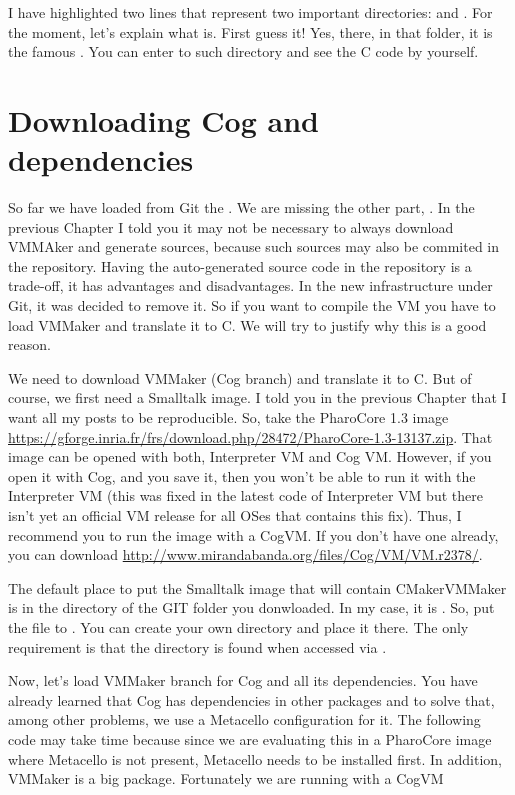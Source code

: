 \documentclass[a4paper,10pt,twoside]{book}
\begin{document}
I have highlighted two lines that represent two important directories:  and . For the moment, let's explain what  is. First guess it! Yes, there, in that folder, it is the famous . You can enter to such directory and see the C code by yourself.

\section{Downloading Cog and dependencies}

So far we have loaded from Git the . We are missing the other part, . In the previous Chapter I told you it may not be necessary to always download VMMAker and generate sources, because such sources may also be commited in the repository. Having the auto-generated source code in the repository is a trade-off, it has advantages and disadvantages. In the new infrastructure under Git, it was decided to remove it. So if you want to compile the VM you have to load VMMaker and translate it to C. We will try to justify why this is a good reason. 

We need to download VMMaker (Cog branch) and translate it to C. But of course, we first need a Smalltalk image. I told you in the previous Chapter that I want all my posts to be reproducible. So, take the PharoCore 1.3 image \url{https://gforge.inria.fr/frs/download.php/28472/PharoCore-1.3-13137.zip}. That image can be opened with both, Interpreter VM and Cog VM. However, if you open it with Cog, and you save it, then you won't be able to run it with the Interpreter VM (this was fixed in the latest code of Interpreter VM but there isn't yet an official VM release for all OSes that contains this fix). Thus, I recommend you to run the image with a CogVM. If you don't have one already, you can download \url{http://www.mirandabanda.org/files/Cog/VM/VM.r2378/}.


The default place to put the Smalltalk image that will contain CMakerVMMaker is in the directory  of the GIT folder you donwloaded. In my case, it is .  So, put the  file to . You can create your own directory    and place it there. The only requirement is that the  directory is found when accessed via .



Now, let's load VMMaker branch for Cog and all its dependencies. You have already learned that Cog has dependencies in other packages and to solve that, among other problems, we use a Metacello configuration for it. The following code may take time because since we are evaluating this in a PharoCore image where Metacello is not present, Metacello needs to be installed first. In addition, VMMaker is a big package. Fortunately we are running with a CogVM     
\end{document}

